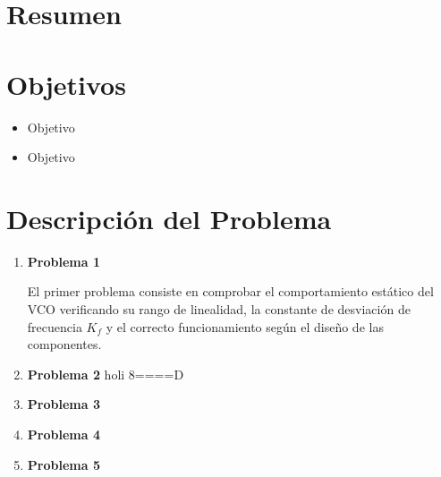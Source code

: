 \documentclass[letterpaper, titlepage]{article}
\begin{document}
\maketitle
\newpage
\section{Resumen}
\section{Objetivos}
	\begin{itemize}
		\item Objetivo
		\item Objetivo
	\end{itemize}
\newpage

\section{Descripción del Problema}
	\begin{enumerate}
		\item \textbf{Problema 1}
		
		El primer problema consiste en comprobar el comportamiento estático del VCO verificando su rango de linealidad, la constante de desviación de frecuencia $K_f$ y el correcto funcionamiento según el diseño de las componentes.
		\item \textbf{Problema 2}
		holi 8====D
		\item \textbf{Problema 3}
		
		\item \textbf{Problema 4}
		
		\item \textbf{Problema 5}
	\end{enumerate}
\newpage
\end{document}
